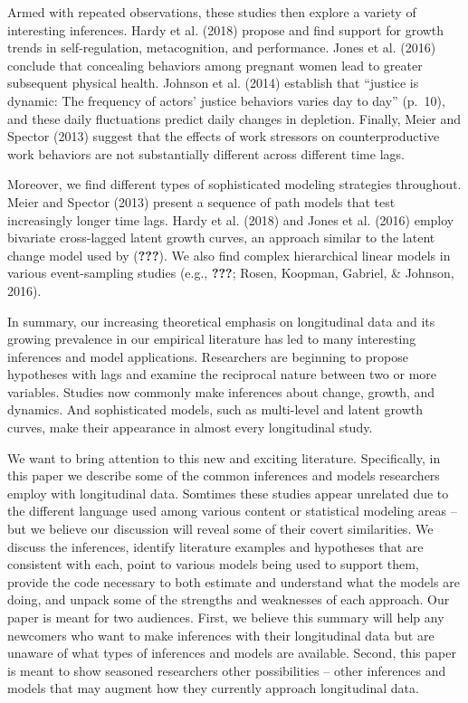 \documentclass[english,,man]{apa6}
\theoremstyle{definition}
\theoremstyle{definition}
\theoremstyle{definition}
\theoremstyle{remark}
\begin{document}
Armed with repeated observations, these studies then explore a variety
of interesting inferences. Hardy et al. (2018) propose and find support
for growth trends in self-regulation, metacognition, and performance.
Jones et al. (2016) conclude that concealing behaviors among pregnant
women lead to greater subsequent physical health. Johnson et al. (2014)
establish that \enquote{justice is dynamic: The frequency of actors'
justice behaviors varies day to day} (p.~10), and these daily
fluctuations predict daily changes in depletion. Finally, Meier and
Spector (2013) suggest that the effects of work stressors on
counterproductive work behaviors are not substantially different across
different time lags.

Moreover, we find different types of sophisticated modeling strategies
throughout. Meier and Spector (2013) present a sequence of path models
that test increasingly longer time lags. Hardy et al. (2018) and Jones
et al. (2016) employ bivariate cross-lagged latent growth curves, an
approach similar to the latent change model used by ({\textbf{???}}). We
also find complex hierarchical linear models in various event-sampling
studies (e.g., {\textbf{???}}; Rosen, Koopman, Gabriel, \& Johnson,
2016).

In summary, our increasing theoretical emphasis on longitudinal data and
its growing prevalence in our empirical literature has led to many
interesting inferences and model applications. Researchers are beginning
to propose hypotheses with lags and examine the reciprocal nature
between two or more variables. Studies now commonly make inferences
about change, growth, and dynamics. And sophisticated models, such as
multi-level and latent growth curves, make their appearance in almost
every longitudinal study.

We want to bring attention to this new and exciting literature.
Specifically, in this paper we describe some of the common inferences
and models researchers employ with longitudinal data. Somtimes these
studies appear unrelated due to the different language used among
various content or statistical modeling areas -- but we believe our
discussion will reveal some of their covert similarities. We discuss the
inferences, identify literature examples and hypotheses that are
consistent with each, point to various models being used to support
them, provide the code necessary to both estimate and understand what
the models are doing, and unpack some of the strengths and weaknesses of
each approach. Our paper is meant for two audiences. First, we believe
this summary will help any newcomers who want to make inferences with
their longitudinal data but are unaware of what types of inferences and
models are available. Second, this paper is meant to show seasoned
researchers other possibilities -- other inferences and models that may
augment how they currently approach longitudinal data.
\end{document}
